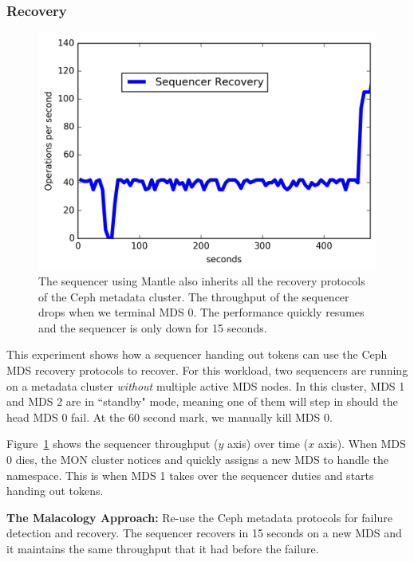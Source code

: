 \documentclass[preprint]{sigplanconf-eurosys}
\begin{document}
\subsubsection{Recovery}

\begin{figure}[t]
\centering
\includegraphics{figures/recovery-seq-thruput.png}
\caption{The sequencer using Mantle also inherits all the recovery protocols of
the Ceph metadata cluster. The throughput of the sequencer drops when we
terminal MDS 0. The performance quickly resumes and the sequencer is only down
for 15 seconds.}
\label{fig:recovery-seq-thruput}
\end{figure}

This experiment shows how a sequencer handing out tokens can use the Ceph MDS
recovery protocols to recover. For this workload, two sequencers are running on
a metadata cluster {\it without} multiple active MDS nodes. In this cluster,
MDS 1 and MDS 2 are in ``standby" mode, meaning one of them will step in should
the head MDS 0 fail. At the 60 second mark, we manually kill MDS 0. 

Figure~\ref{fig:recovery-seq-thruput} shows the sequencer throughput (\(y\)
axis) over time (\(x\) axis). When MDS 0 dies, the MON cluster notices and
quickly assigns a new MDS to handle the namespace. This is when MDS 1 takes
over the sequencer duties and starts handing out tokens.

\textbf{The Malacology Approach:} Re-use the Ceph metadata protocols for
failure detection and recovery. The sequencer recovers in 15 seconds on a new
MDS and it maintains the same throughput that it had before the failure.
\end{document}
